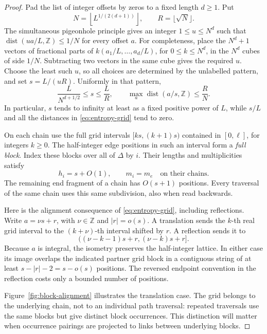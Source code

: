 \begin{proof}
Pad the list of integer offsets by zeros to a fixed length \(d\ge1\).
Put
\[
 N=\left\lfloor L^{1/(2(d+1))}\right\rfloor,
 \qquad R=\lfloor\sqrt N\rfloor.
\]
The simultaneous pigeonhole principle gives an integer
\(1\le u\le N^d\) such that
\(\operatorname{dist}(ua/L,\mathbb Z)\le1/N\) for every offset \(a\).
For completeness, place the \(N^d+1\) vectors of fractional parts of
\(k(a_1/L,\ldots,a_d/L)\), for \(0\le k\le N^d\), in the \(N^d\)
cubes of side \(1/N\).  Subtracting two vectors in the same cube gives
the required \(u\).  Choose the least such \(u\), so all choices are
determined by the unlabelled pattern, and set \(s=L/(uR)\).  Uniformly in
that pattern,
\begin{equation}
 \frac{L}{N^{d+1/2}}\le s\le\frac{L}{R},\qquad
 \max_a\operatorname{dist}(a/s,\mathbb Z)\le\frac{R}{N}.
 \label{eq:entropy-grid}
\end{equation}
In particular, \(s\) tends to infinity at least as a fixed positive
power of \(L\), while \(s/L\) and all the distances in
\eqref{eq:entropy-grid} tend to zero.

On each chain use the full grid intervals \([ks,(k+1)s)\) contained in
\([0,\ell]\), for integers \(k\ge0\).  The half-integer edge positions
in such an interval form a \emph{full block}.  Index these blocks over
all of \(\Delta\) by \(i\).  Their lengths and multiplicities satisfy
\[
 h_i=s+O(1),\qquad m_i=m_e\quad\text{on their chains}.
\]
The remaining end fragment of a chain has \(O(s+1)\) positions.  Every
traversal of the same chain uses this same subdivision, also when read
backwards.

Here is the alignment consequence of \eqref{eq:entropy-grid}, including
reflections.  Write \(a=\nu s+r\), with \(\nu\in\mathbb Z\) and
\(|r|=o(s)\).  A translation sends the \(k\)-th real grid interval to
the \((k+\nu)\)-th interval shifted by \(r\).  A reflection sends it to
\[
 ((\nu-k-1)s+r,(\nu-k)s+r].
\]
Because \(a\) is integral, the isometry preserves the half-integer
lattice.  In either case its image overlaps the indicated partner
grid block in a contiguous string of at least \(s-|r|-2=s-o(s)\)
positions.  The reversed endpoint convention in the reflection costs
only a bounded number of positions.

Figure~\ref{fig:block-alignment} illustrates the translation case.
The grid belongs to the underlying chain, not to an individual path
traversal: repeated traversals use the same blocks but give distinct
block occurrences. This distinction will matter when occurrence
pairings are projected to links between underlying blocks.


\end{proof}
